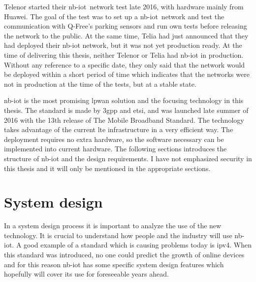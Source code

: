 \documentclass[USenglish]{ifimaster}  %
\begin{document}
Telenor started their \acrshort{nb-iot} network test late 2016, with hardware mainly from Huawei. The goal of the test was to set up a \acrshort{nb-iot} network and test the communication with Q-Free's parking sensors and run own tests before releasing the network to the public. At the same time, Telia had just announced that they had deployed their \acrshort{nb-iot} network, but it was not yet production ready. At the time of delivering this thesis, neither Telenor or Telia had \acrshort{nb-iot} in production. Without any reference to a specific date, they only said that the network would be deployed within a short period of time which indicates that the networks were not in production at the time of the tests, but at a stable state.

\acrshort{nb-iot} is the most promising \acrshort{lpwan} solution and the focusing technology in this thesis. The standard is made by \acrshort{3gpp} and \acrfull{etsi}, and was launched late summer of 2016 with the 13th release of The Mobile Broadband Standard. The technology takes advantage of the current \acrshort{lte} infrastructure in a very efficient way. The deployment requires no extra hardware, so the software necessary can be implemented into current hardware. The following sections introduces the structure of \acrshort{nb-iot} and the design requirements. I have not emphasized security in this thesis and it will only be mentioned in the appropriate sections.

\section{System design}
In a system design process it is important to analyze the use of the new technology. It is crucial to understand how people and the industry will use \acrshort{nb-iot}. A good example of a standard which is causing problems today is \acrshort{ipv4}. When this standard was introduced, no one could predict the growth of online devices and for this reason \acrshort{nb-iot} has some specific system design features which hopefully will cover its use for foreseeable years ahead.
\end{document}
